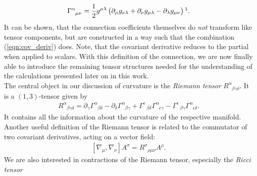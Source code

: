 \begin{align}
\Gamma_{\phantom{\alpha}\mu \nu}^{\alpha}=\frac{1}{2} g^{\mu \lambda}\left(\partial_{\mu} g_{\nu \lambda}+\partial_{\nu} g_{\mu \lambda}-\partial_{\lambda} g_{\mu \nu}\right)\footnotemark.	
\end{align}
It can be shown, that the connection coefficients themselves do \textit{not} transform like tensor components, but are constructed in a way such that the combination (\ref{eqn:cov_deriv}) does. Note, that the covariant derivative reduces to the partial when applied to scalars. With this definition of the connection, we are now finally able to introduce the remaining tensor structures needed for the understanding of the calculations presented later on in this work. \\
The central object in our discussion of curvature is the \textit{Riemann tensor} $R_{\phantom{\alpha}\beta \gamma \delta}^{\alpha}$. It is a $(1, 3)$-tensor given by
\begin{align} 
	R_{\phantom{\alpha}\beta \gamma \delta}^{\alpha}=\partial_{\gamma} \Gamma_{\phantom{\alpha}\beta \delta}^{\alpha}-\partial_{\delta} \Gamma_{\phantom{\alpha}\beta \gamma}^{\alpha}+\Gamma_{\phantom{\alpha}\beta \delta}^{\epsilon} \Gamma_{\phantom{\alpha}\epsilon \gamma}^{\alpha}-\Gamma_{\phantom{\alpha}\beta \gamma}^{\epsilon} \Gamma_{\phantom{\alpha}\epsilon \delta}^{\alpha}.
\end{align}
It contains all the information about the curvature of the respective manifold. Another useful definition of the Riemann tensor is related to the commutator of two covariant derivatives, acting on a vector field:
\begin{align}
	\left[\nabla_{\mu}, \nabla_{\nu}\right] A^{\sigma}=R_{\phantom{\alpha}\rho \mu \nu}^{\sigma} A^{\rho}. \label{eqn:Riemann}
\end{align}
We are also interested in contractions of the Riemann tensor, especially the \textit{Ricci tensor} 
